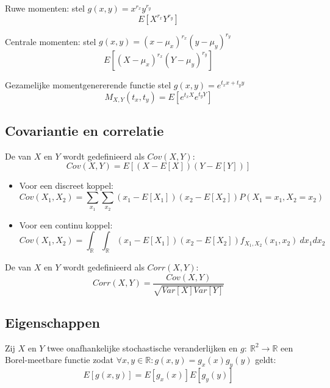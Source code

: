 \documentclass[main.tex]{subfiles}
\begin{document}
\begin{de}
  Ruwe momenten:
  stel $g(x,y) = x^{r_{x}}y^{r_{y}}$
  \[ E[X^{r_{x}}Y^{r_{y}}] \]
\end{de}

\begin{de}
  Centrale momenten:
  stel $g(x,y) = (x-\mu_{x})^{r_{x}}(y-\mu_{y})^{r_{y}}$
  \[ E[(X-\mu_{x})^{r_{x}}(Y-\mu_{y})^{r_{y}}] \]
\end{de}

\begin{de}
  Gezamelijke momentgenererende functie
  stel $g(x,y) = e^{t_{x}x+t_{y}y}$
  \[ M_{X,Y}(t_{x},t_{y}) = E[e^{t_{x}X}e^{t_{y}Y}] \]
\end{de}


\subsection{Covariantie en correlatie}
\label{sec:covar-en-corr}

\begin{de}
  De  van $X$ en $Y$ wordt gedefinieerd als $Cov(X,Y)$:
  \[ Cov(X,Y) = E[(X-E[X])(Y-E[Y])] \]

  \begin{itemize}
  \item Voor een discreet koppel:
    \[ Cov(X_{1},X_{2}) = \sum_{x_{1}}\sum_{x_{2}}\left(x_{1}-E\left[X_{1}\right]\right)\left(x_{2}-E\left[X_{2}\right]\right)P(X_{1} = x_{1}, X_{2} = x_{2}) \]
  \item Voor een continu koppel:
    \[ Cov(X_{1},X_{2}) = \int_{\mathbb{R}}\int_{\mathbb{R}}\left(x_{1}-E\left[X_{1}\right]\right)\left(x_{2}-E\left[X_{2}\right]\right)f_{X_{1},X_{2}}(x_{1},x_{2})\ dx_{1}dx_{2} \]
  \end{itemize}
\end{de}

\begin{de}
  De  van $X$ en $Y$ wordt gedefinieerd als $Corr(X,Y)$:
  \[ Corr(X,Y) = \frac{Cov(X,Y)}{\sqrt{Var[X]Var[Y]}} \]
\end{de}



\subsection{Eigenschappen}
\label{sec:eigenschappen}

\begin{st}
  Zij $X$ en $Y$ twee onafhankelijke stochastische veranderlijken en $g:\ \mathbb{R}^{2} \rightarrow \mathbb{R}$ een Borel-meetbare functie zodat $\forall x,y\in \mathbb{R}: g(x,y) =g_{x}(x)g_{y}(y)$ geldt:
  \[ E[g(x,y)] = E[g_{x}(x)]E[g_{y}(y)] \]
\end{st}
\end{document}
